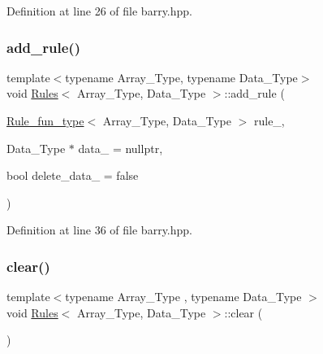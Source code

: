Definition at line 26 of file barry.\+hpp.

\mbox{\label{classbarry_1_1_rules_abbc63747014445b538384bb500464bb5}} 
\subsubsection{\texorpdfstring{add\+\_\+rule()}{add\_rule()}\hspace{0.1cm}{\footnotesize\ttfamily [3/3]}}
{\footnotesize\ttfamily template$<$typename Array\+\_\+\+Type, typename Data\+\_\+\+Type$>$ \\
void \hyperlink{classbarry_1_1_rules}{Rules}$<$ Array\+\_\+\+Type, Data\+\_\+\+Type $>$\+::add\+\_\+rule (\begin{DoxyParamCaption}\item[{\hyperlink{namespacebarry_aefd7e6d4ba228e2ce1074d075c512178}{Rule\+\_\+fun\+\_\+type}$<$ Array\+\_\+\+Type, Data\+\_\+\+Type $>$}]{rule\+\_\+,  }\item[{Data\+\_\+\+Type $\ast$}]{data\+\_\+ = {\ttfamily nullptr},  }\item[{bool}]{delete\+\_\+data\+\_\+ = {\ttfamily false} }\end{DoxyParamCaption})\hspace{0.3cm}{\ttfamily [inline]}}



Definition at line 36 of file barry.\+hpp.

\mbox{\label{classbarry_1_1_rules_a135a15d3ff70d4350d76a15f8e85f7df}} 
\subsubsection{\texorpdfstring{clear()}{clear()}}
{\footnotesize\ttfamily template$<$typename Array\+\_\+\+Type , typename Data\+\_\+\+Type $>$ \\
void \hyperlink{classbarry_1_1_rules}{Rules}$<$ Array\+\_\+\+Type, Data\+\_\+\+Type $>$\+::clear (\begin{DoxyParamCaption}{ }\end{DoxyParamCaption})\hspace{0.3cm}{\ttfamily [inline]}}



